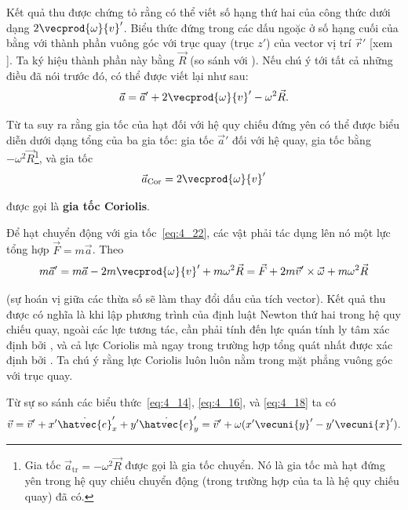 \noindent
Kết quả thu được chứng tỏ rằng có thể viết số hạng thứ hai của công thức  dưới dạng $2\vecprod{\omega}{v}'$. Biểu thức đứng trong các dấu ngoặc ở số hạng cuối của  bằng với thành phần vuông góc với trục quay (trục $z'$) của vector vị trí $\vec{r}'$ [xem ]. Ta ký hiệu thành phần này bằng $\vec{R}$ (so sánh với ). Nếu chú ý tới tất cả những điều đã nói trước đó,  có thể được viết lại như sau:
\begin{equation}\label{eq:4_22}
\vec{a} = \vec{a}' + 2\vecprod{\omega}{v}' - \omega^2\vec{R}.
\end{equation}

Từ  ta suy ra rằng gia tốc của hạt đối với hệ quy chiếu đứng yên có thể được biểu diễn dưới dạng tổng của ba gia tốc: gia tốc $\vec{a}'$ đối với hệ quay, gia tốc bằng $-\omega^2\vec{R}$\footnote{Gia tốc $\vec{a}_{\text{tr}}=-\omega^2\vec{R}$ được gọi là gia tốc chuyển. Nó là gia tốc mà hạt đứng yên trong hệ quy chiếu chuyển động (trong trường hợp của ta là hệ quy chiếu quay) đã có.}, và gia tốc
\begin{equation}\label{eq:4_23}
\vec{a}_{\text{Cor}} = 2\vecprod{\omega}{v}'
\end{equation}

\noindent
được gọi là \textbf{gia tốc Coriolis}.

Để hạt chuyển động với gia tốc~\eqref{eq:4_22}, các vật phải tác dụng lên nó một lực tổng hợp $\vec{F}=m\vec{a}$. Theo 
\begin{equation}\label{eq:4_24}
m\vec{a}' = m\vec{a} - 2m\vecprod{\omega}{v}' + m\omega^2\vec{R} = \vec{F} + 2m\vec{v}'\times\vec{\omega} + m\omega^2\vec{R}
\end{equation}

\noindent
(sự hoán vị giữa các thừa số sẽ làm thay đổi dấu của tích vector). Kết quả thu được có nghĩa là khi lập phương trình của định luật Newton thứ hai trong hệ quy chiếu quay, ngoài các lực tương tác, cần phải tính đến lực quán tính ly tâm xác định bởi , và cả lực Coriolis mà ngay trong trường hợp tổng quát nhất được xác định bởi . Ta chú ý rằng lực Coriolis luôn luôn nằm trong mặt phẳng vuông góc với trục quay.

Từ sự so sánh các biểu thức~\eqref{eq:4_14}, \eqref{eq:4_16}, và \eqref{eq:4_18} ta có
\begin{equation*}
\vec{v} = \vec{v}' + x'\dot{\hatvec{e}}_x' + y'\dot{\hatvec{e}}_y' = \vec{v}' + \omega(x'\vecuni{y}' - y'\vecuni{x}').
\end{equation*}

